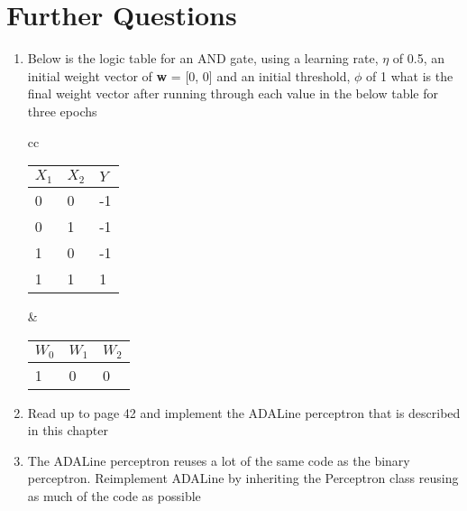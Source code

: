 \documentclass[12pt]{article}
\begin{document}
\section{Further Questions}
\begin{enumerate}
\item Below is the logic table for an AND gate, using a learning rate, $\eta$ of 0.5, an initial weight vector of \textbf{w} = [0, 0] and an initial threshold, $\phi$ of 1 what is the final weight vector after running through each value in the below table for three epochs
\begin{tabular}{cc}
	\begin{minipage}{.5\linewidth}
		\begin{tabular}{ll|l}
		$X_1$ & $X_2$ & $Y$ \\ \hline
		0 & 0 & -1 \\
		0 & 1 & -1 \\
		1 & 0 & -1 \\
		1 & 1 & 1
		\end{tabular}
	\end{minipage} & 
	\begin{minipage}{.5\linewidth}
		\begin{tabular}{lll}
		$W_0$ & $W_1$ & $W_2$ \\ \hline
		1 & 0 & 0 
		\end{tabular}
	\end{minipage} 
\end{tabular}
\item Read up to page 42 and implement the ADALine perceptron that is described in this chapter 
\item The ADALine perceptron reuses a lot of the same code as the binary perceptron. Reimplement ADALine by inheriting the Perceptron class reusing as much of the code as possible
\end{enumerate}
\end{document}
